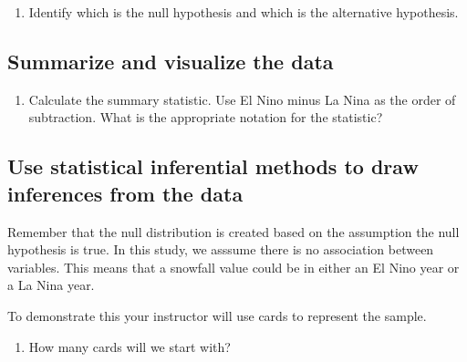 \documentclass[
]{report}
\providecommand{\tightlist}{%
  \setlength{\itemsep}{0pt}\setlength{\parskip}{0pt}}
\begin{document}
\vspace{1in}

\begin{enumerate}
\def\labelenumi{\arabic{enumi}.}
\setcounter{enumi}{7}
\tightlist
\item
  Identify which is the null hypothesis and which is the alternative hypothesis.
\end{enumerate}

\vspace{1in}

\hypertarget{summarize-and-visualize-the-data}{%
\subsection{Summarize and visualize the data}\label{summarize-and-visualize-the-data}}

\begin{enumerate}
\def\labelenumi{\arabic{enumi}.}
\setcounter{enumi}{8}
\tightlist
\item
  Calculate the summary statistic. Use El Nino minus La Nina as the order of subtraction. What is the appropriate notation for the statistic?
\end{enumerate}

\vspace{0.5in}

\hypertarget{use-statistical-inferential-methods-to-draw-inferences-from-the-data}{%
\subsection{Use statistical inferential methods to draw inferences from the data}\label{use-statistical-inferential-methods-to-draw-inferences-from-the-data}}

Remember that the null distribution is created based on the assumption the null hypothesis is true. In this study, we asssume there is no association between variables. This means that a snowfall value could be in either an El Nino year or a La Nina year.

To demonstrate this your instructor will use cards to represent the sample.

\begin{enumerate}
\def\labelenumi{\arabic{enumi}.}
\setcounter{enumi}{9}
\tightlist
\item
  How many cards will we start with?
\end{enumerate}

\vspace{0.5in}
\end{document}

